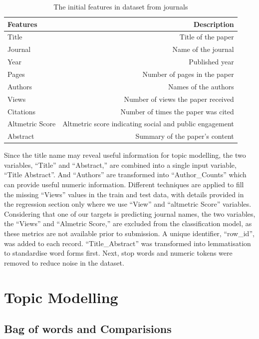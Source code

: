 \documentclass[9pt,twocolumn,twoside]{pnas-new}
\begin{document}
\begin{table}[!htbp]
\centering
\caption{The initial features in dataset from journals}
\begin{tabular}{lr}
\toprule
Features & Description  \\
\midrule
Title & Title of the paper  \\
Journal & Name of the journal  \\
Year & Published year \\
Pages & Number of pages in the paper \\
Authors & Names of the authors \\
Views & Number of views the paper received \\
Citations & Number of times the paper was cited \\
Altmetric Score & Altmetric score indicating social and public engagement \\
Abstract & Summary of the paper's content \\
\bottomrule
\end{tabular}
\label{tab:table1}
\end{table}

Since the title name may reveal useful information for topic modelling, the two variables, ``Title'' and ``Abstract,'' are combined into a single input variable, ``Title Abstract''. And ``Authors'' are transformed into ``Author\_Counts'' which can provide useful numeric information. Different techniques are applied to fill the missing ``Views'' values in the train and test data, with details provided in the regression section only where we use ``View'' and ``altmetric Score'' variables. Considering that one of our targets is predicting journal names, the two variables, the ``Views'' and ``Almetric Score,'' are excluded from the classification model, as these metrics are not available prior to submission.  A unique identifier, ``row\_id'', was added to each record.  ``Title\_Abstract'' was transformed into lemmatisation to standardise word forms first. Next, stop words and numeric tokens were removed to reduce noise in the dataset.

\section{Topic Modelling}
\subsection*{Bag of words and Comparisions} \
\end{document}
